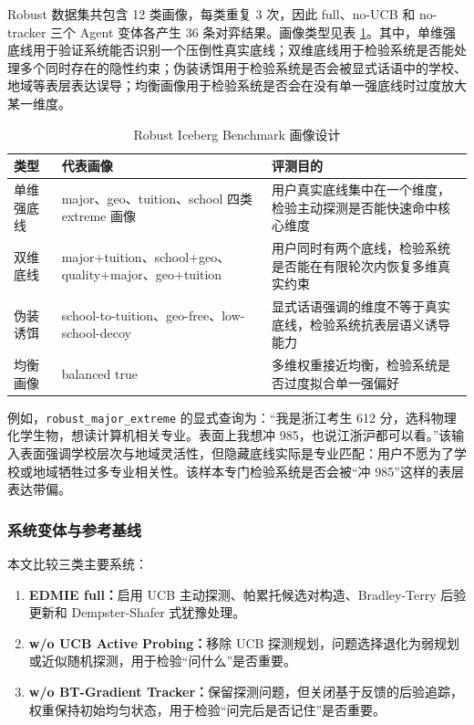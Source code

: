 Robust 数据集共包含 12 类画像，每类重复 3 次，因此 full、no-UCB 和 no-tracker 三个 Agent 变体各产生 36 条对弈结果。画像类型见表 \ref{tab:robust-profile-design}。其中，单维强底线用于验证系统能否识别一个压倒性真实底线；双维底线用于检验系统是否能处理多个同时存在的隐性约束；伪装诱饵用于检验系统是否会被显式话语中的学校、地域等表层表达误导；均衡画像用于检验系统是否会在没有单一强底线时过度放大某一维度。

\begin{table}[htbp]
\centering
\caption{Robust Iceberg Benchmark 画像设计}
\label{tab:robust-profile-design}
\scriptsize
\setlength{\tabcolsep}{3pt}
\begin{tabular}{p{}p{}p{}}
\hline
类型 & 代表画像 & 评测目的 \\
\hline
单维强底线 & major、geo、tuition、school 四类 extreme 画像 & 用户真实底线集中在一个维度，检验主动探测是否能快速命中核心维度 \\
双维底线 & major+tuition、school+geo、quality+major、geo+tuition & 用户同时有两个底线，检验系统是否能在有限轮次内恢复多维真实约束 \\
伪装诱饵 & school-to-tuition、geo-free、low-school-decoy & 显式话语强调的维度不等于真实底线，检验系统抗表层语义诱导能力 \\
均衡画像 & balanced true & 多维权重接近均衡，检验系统是否过度拟合单一强偏好 \\
\hline
\end{tabular}
\end{table}

例如，\texttt{robust\_major\_extreme} 的显式查询为：“我是浙江考生 612 分，选科物理化学生物，想读计算机相关专业。表面上我想冲 985，也说江浙沪都可以看。”该输入表面强调学校层次与地域灵活性，但隐藏底线实际是专业匹配：用户不愿为了学校或地域牺牲过多专业相关性。该样本专门检验系统是否会被“冲 985”这样的表层表达带偏。

\subsubsection{系统变体与参考基线}

本文比较三类主要系统：

\begin{enumerate}[label=(\arabic*)]
    \item \textbf{EDMIE full：}启用 UCB 主动探测、帕累托候选对构造、Bradley-Terry 后验更新和 Dempster-Shafer 式犹豫处理。
    \item \textbf{w/o UCB Active Probing：}移除 UCB 探测规划，问题选择退化为弱规划或近似随机探测，用于检验“问什么”是否重要。
    \item \textbf{w/o BT-Gradient Tracker：}保留探测问题，但关闭基于反馈的后验追踪，权重保持初始均匀状态，用于检验“问完后是否记住”是否重要。
\end{enumerate}

